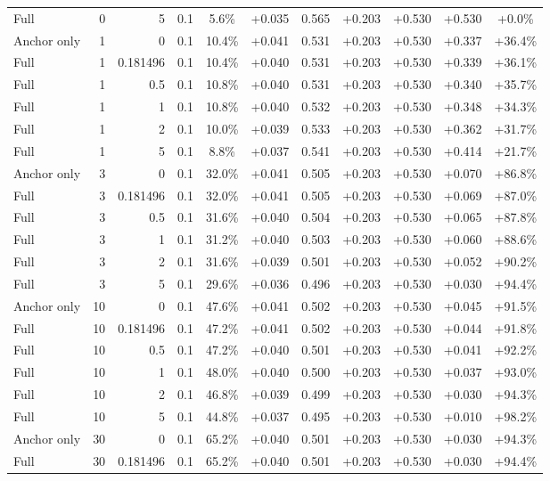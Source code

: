 \begin{table}[htbp]
\begin{tabular}{lrrrccccccc}
Full & 0 & 5 & 0.1 & 5.6\% & +0.035 & 0.565 & +0.203 & +0.530 & +0.530 & +0.0\% \\
Anchor only & 1 & 0 & 0.1 & 10.4\% & +0.041 & 0.531 & +0.203 & +0.530 & +0.337 & +36.4\% \\
Full & 1 & 0.181496 & 0.1 & 10.4\% & +0.040 & 0.531 & +0.203 & +0.530 & +0.339 & +36.1\% \\
Full & 1 & 0.5 & 0.1 & 10.8\% & +0.040 & 0.531 & +0.203 & +0.530 & +0.340 & +35.7\% \\
Full & 1 & 1 & 0.1 & 10.8\% & +0.040 & 0.532 & +0.203 & +0.530 & +0.348 & +34.3\% \\
Full & 1 & 2 & 0.1 & 10.0\% & +0.039 & 0.533 & +0.203 & +0.530 & +0.362 & +31.7\% \\
Full & 1 & 5 & 0.1 & 8.8\% & +0.037 & 0.541 & +0.203 & +0.530 & +0.414 & +21.7\% \\
Anchor only & 3 & 0 & 0.1 & 32.0\% & +0.041 & 0.505 & +0.203 & +0.530 & +0.070 & +86.8\% \\
Full & 3 & 0.181496 & 0.1 & 32.0\% & +0.041 & 0.505 & +0.203 & +0.530 & +0.069 & +87.0\% \\
Full & 3 & 0.5 & 0.1 & 31.6\% & +0.040 & 0.504 & +0.203 & +0.530 & +0.065 & +87.8\% \\
Full & 3 & 1 & 0.1 & 31.2\% & +0.040 & 0.503 & +0.203 & +0.530 & +0.060 & +88.6\% \\
Full & 3 & 2 & 0.1 & 31.6\% & +0.039 & 0.501 & +0.203 & +0.530 & +0.052 & +90.2\% \\
Full & 3 & 5 & 0.1 & 29.6\% & +0.036 & 0.496 & +0.203 & +0.530 & +0.030 & +94.4\% \\
Anchor only & 10 & 0 & 0.1 & 47.6\% & +0.041 & 0.502 & +0.203 & +0.530 & +0.045 & +91.5\% \\
Full & 10 & 0.181496 & 0.1 & 47.2\% & +0.041 & 0.502 & +0.203 & +0.530 & +0.044 & +91.8\% \\
Full & 10 & 0.5 & 0.1 & 47.2\% & +0.040 & 0.501 & +0.203 & +0.530 & +0.041 & +92.2\% \\
Full & 10 & 1 & 0.1 & 48.0\% & +0.040 & 0.500 & +0.203 & +0.530 & +0.037 & +93.0\% \\
Full & 10 & 2 & 0.1 & 46.8\% & +0.039 & 0.499 & +0.203 & +0.530 & +0.030 & +94.3\% \\
Full & 10 & 5 & 0.1 & 44.8\% & +0.037 & 0.495 & +0.203 & +0.530 & +0.010 & +98.2\% \\
Anchor only & 30 & 0 & 0.1 & 65.2\% & +0.040 & 0.501 & +0.203 & +0.530 & +0.030 & +94.3\% \\
Full & 30 & 0.181496 & 0.1 & 65.2\% & +0.040 & 0.501 & +0.203 & +0.530 & +0.030 & +94.4\% \\

\end{tabular}
\end{table}
